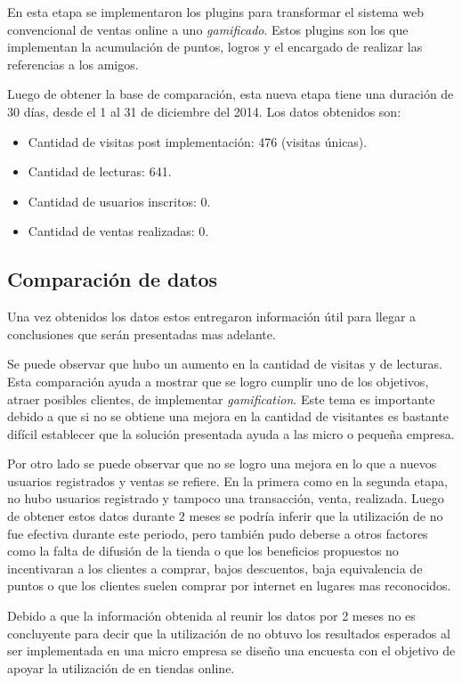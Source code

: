 En esta etapa se implementaron los plugins para transformar el sistema web convencional de ventas
online a uno \emph{gamificado}. Estos plugins son los que implementan la acumulación de puntos,
logros y el encargado de realizar las referencias a los amigos.

Luego de obtener la base de comparación, esta nueva etapa tiene una duración de 30 días, desde
el 1 al 31 de diciembre del 2014. Los datos obtenidos son:

\begin{itemize}
\item Cantidad de visitas post implementación: 476 (visitas únicas).
\item Cantidad de lecturas: 641.
\item Cantidad de usuarios inscritos: 0.
\item Cantidad de ventas realizadas: 0.
\end{itemize}

\subsection{Comparación de datos}

Una vez obtenidos los datos estos entregaron información útil para llegar a conclusiones que serán
presentadas mas adelante.

Se puede observar que hubo un aumento en la cantidad de visitas y de lecturas. Esta comparación
ayuda a mostrar que se logro cumplir uno de los objetivos, atraer posibles clientes, de implementar
 \emph{gamification}. Este tema es importante debido a que si no se obtiene una mejora en la cantidad
de visitantes es bastante difícil establecer que la solución presentada ayuda a las micro o pequeña
empresa.

Por otro lado se puede observar que no se logro una mejora en lo que a nuevos usuarios registrados y
ventas se refiere. En la primera como en la segunda etapa, no hubo usuarios registrado y tampoco
una transacción, venta, realizada.
Luego de obtener estos datos durante $2$ meses se podría inferir que la utilización de {\GAM} no fue
efectiva durante este periodo, pero también pudo deberse a otros factores como la falta de difusión
de la tienda o que los beneficios propuestos no incentivaran a los clientes a comprar, bajos descuentos,
baja equivalencia de puntos o que los clientes suelen comprar por internet en lugares mas reconocidos.

Debido a que la información obtenida al reunir los datos por 2 meses no es concluyente para decir que
la utilización de {\GAM} no obtuvo los resultados esperados al ser implementada en una micro empresa se
diseño una encuesta con el objetivo de apoyar la utilización de {\GAM} en tiendas online.

